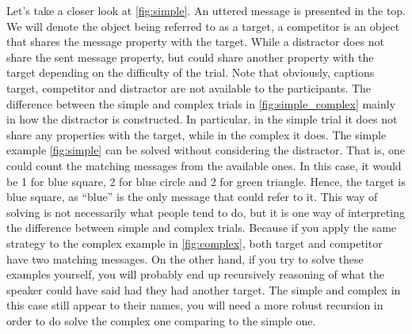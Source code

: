Let's take a closer look at \autoref{fig:simple}. An uttered message is presented in the top. We will denote the object being referred to as a target, a competitor is an object that shares the message property with the target. While a distractor does not share the sent message property, but could share another property with the target depending on the difficulty of the trial. Note that obviously, captions target, competitor and distractor are not available to the participants. The difference between the simple and complex trials in \autoref{fig:simple_complex} mainly in how the distractor is constructed. In particular, in the simple trial it does not share any properties with the target, while in the complex it does. The simple example \autoref{fig:simple} can be solved without considering the distractor. That is, one could count the matching messages from the available ones. In this case, it would be 1 for blue square, 2 for blue circle and 2 for green triangle. Hence, the target is blue square, as ``blue'' is the only message that could refer to it. This way of solving is not necessarily what people tend to do, but it is one way of interpreting the difference between simple and complex trials. Because if you apply the same strategy to the complex example in \autoref{fig:complex}, both target and competitor have two matching messages. On the other hand, if you try to solve these examples yourself, you will probably end up recursively reasoning of what the speaker could have said had they had another target. The simple and complex in this case still appear to their names, you will need a more robust recursion in order to do solve the complex one comparing to the simple one.


